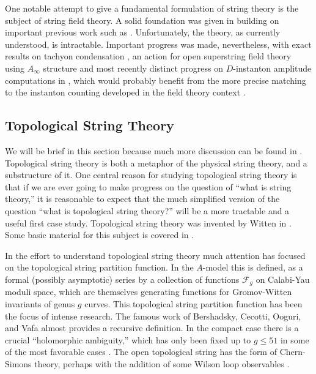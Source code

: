 \documentclass[12pt]{article}
\newcommand\CalF{\mathcal{F}}
\begin{document}
One notable attempt to give 
a fundamental formulation of string theory is
the subject of string field theory. A solid foundation was given in \cite{Zwiebach:1992ie,Taylor:2003gn}
building on important previous work such as \cite{Witten:1985cc}.  Unfortunately, the theory,
as currently understood, is intractable. 
Important progress was made, nevertheless, 
with exact results on tachyon condensation \cite{Schnabl:2005gv,Fuchs:2008cc}, an action for open superstring field theory using $A_\infty$ structure\cite{Erler:2016ybs}
and most recently distinct progress on $D$-instanton amplitude computations 
in \cite{Sen:2019qqg,Sen:2020cef,Sen:2020eck}, which would probably benefit from the more precise matching to the instanton counting developed 
in the field theory context \cite{Nekrasov:2002qd,Nekrasov:Japan}. 




\subsection{Topological String Theory}
\label{subsec:topstrth}

We will be brief in this section because much more 
discussion can be found in \cite{Commando}. 
Topological string theory is both a metaphor of the physical string theory, and a substructure of it. 
One central reason for studying topological string theory 
is that if we are ever going to make progress on the question 
of ``what is string theory,'' it is reasonable to expect that 
the much simplified version of the question 
``what is topological string theory?'' will be a more tractable
and a useful first case study. Topological string theory was 
invented by Witten in \cite{Witten:1988xj,Witten:1991zz}.
Some basic material for this subject is covered in 
\cite{HoriMirrorSymmetryBook,AspinwallMirrorSymmetryBook}.




In the effort to understand topological string theory much attention has
focused on the topological string partition function. In the $A$-model this is defined, as a
formal (possibly asymptotic)  series by a collection of functions ${\CalF}_g$ on Calabi-Yau
moduli space, which are themselves generating functions for
Gromov-Witten invariants of genus $g$ curves. This topological string partition function has been the focus of intense research. The famous work of Bershadsky, Cecotti, Ooguri, and Vafa \cite{BCOV:1994} almost
provides a recursive definition. In the compact case there is  a crucial ``holomorphic ambiguity,''
which has only been fixed up to $g\leq 51$ in some of the most favorable cases \cite{Huang:2006hq}. The open topological string has the form of Chern-Simons theory, perhaps with the addition of some Wilson loop observables \cite{Witten:1992fb}.
 
\end{document}
